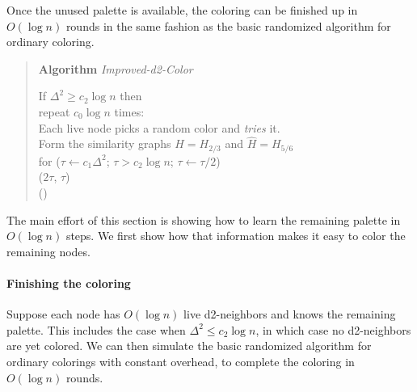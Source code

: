 Once the unused palette is available, the coloring can be finished up in $O(\log n)$ rounds in the same fashion as the basic randomized {\congest} algorithm for ordinary coloring.

\begin{quote}
   \textbf{Algorithm} \emph{Improved-d2-Color}

   If $\Delta^2 \ge c_2\log n$ then  \\
   \hspace*{2em} repeat $c_0 \log n$ times: \\
   \hspace*{4em} Each live node picks a random color and \emph{tries} it. \\     
   \hspace*{2em} Form the similarity graphs $H=H_{2/3}$ and $\hat{H} = H_{5/6}$ \\
   \hspace*{2em} for ($\tau \leftarrow c_1 \Delta^2$; $\tau > c_2\log n$; $\tau \leftarrow \tau/2$) \\
   \hspace*{4em}      ($2 \tau$, $\tau$) \\
    () \\
\end{quote}

The main effort of this section is showing how to learn the remaining palette in $O(\log n)$ steps.
We first show how that information makes it easy to color the remaining nodes.

\paragraph{Finishing the coloring}

Suppose each node has $O(\log n)$ live d2-neighbors and knows the remaining palette. This includes the case when $\Delta^2 \le c_2\log n$, in which case no d2-neighbors are yet colored. 
We can then simulate the basic randomized algorithm for ordinary colorings with constant overhead, to complete the coloring in $O(\log n)$ rounds.

